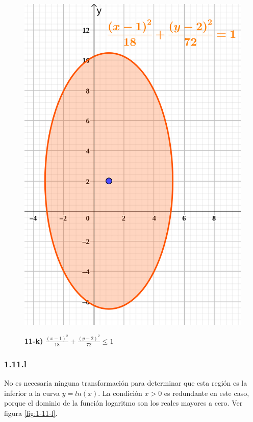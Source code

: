 \documentclass{article}
\begin{document}
\begin{figure}[ht]
\caption{\textbf{11-k)} $\frac{(x-1)^2}{18} + \frac{(y-2)^2}{72} \leq 1$}
\includegraphics[scale=0.3]{img/ejercicios/1/11-k.png} 
\centering
\label{fig:1-11-k}
\end{figure}

\subsubsection*{1.11.l}
\label{subsubsec:1.11.l}

No es necesaria ninguna transformación para determinar que esta región es la inferior a la curva $y = ln(x)$. La condición $x > 0$ es redundante en este caso, porque el dominio de la función logaritmo son los reales mayores a cero. Ver figura \ref{fig:1-11-l}.
\end{document}
